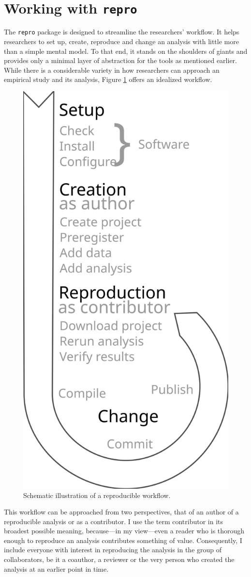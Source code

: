 \documentclass[12pt,a4paper,twoside]{article}
\begin{document}
\hypertarget{working-with-repro}{%
\section{\texorpdfstring{Working with \texttt{repro}}{Working with repro}}\label{working-with-repro}}

The \texttt{repro} package is designed to streamline the researchers' workflow.
It helps researchers to set up, create, reproduce and change an analysis with little more than a simple mental model.
To that end, it stands on the shoulders of giants and provides only a minimal layer of abstraction for the tools as mentioned earlier.
While there is a considerable variety in how researchers can approach an empirical study and its analysis, Figure \ref{fig:workflow} offers an idealized workflow.

\begin{figure}

{\centering \includegraphics[width=0.5\linewidth]{images/idealized-workflow} 

}

\caption{Schematic illustration of a reproducible workflow.  }\label{fig:workflow}
\end{figure}

This workflow can be approached from two perspectives, that of an author of a reproducible analysis or as a contributor.
I use the term contributor in its broadest possible meaning, because---in my view---even a reader who is thorough enough to reproduce an analysis contributes something of value.
Consequently, I include everyone with interest in reproducing the analysis in the group of collaborators, be it a coauthor, a reviewer or the very person who created the analysis at an earlier point in time.
\end{document}
